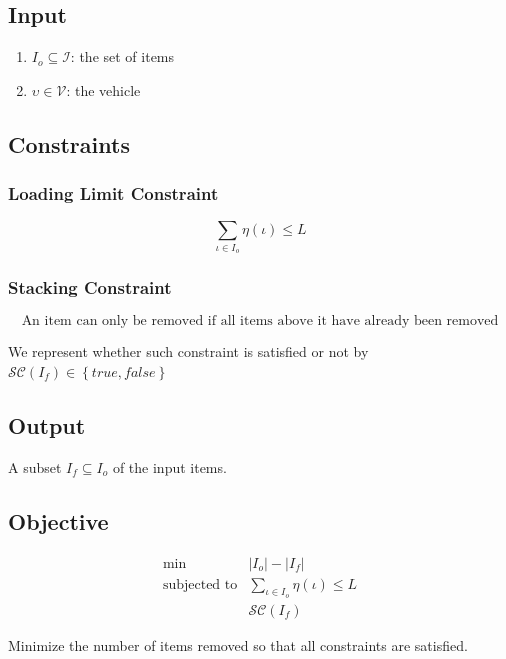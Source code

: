\documentclass{article}
\newcommand{\true}{\ensuremath{true}\xspace}
\newcommand{\false}{\ensuremath{false}\xspace}
\newcommand{\subjectedTo}{\ensuremath{\mbox{subjected to}}\xspace}
\newcommand{\abs}[1]{\ensuremath{\left| #1 \right|}\xspace}
\newcommand{\Set}[1]{\ensuremath{\left\{#1\right\}}}
\newcommand{\vehicleO}{\ensuremath{\upsilon}\xspace}
\newcommand{\vehicleSet}{\mathcal{V}\xspace}
\newcommand{\loadingFunction}{\ensuremath{\eta}\xspace}
\newcommand{\loadingFunctionApply}[1]{\loadingFunction \left( #1 \right)\xspace}
\newcommand{\loadingLimit}{\ensuremath{L}\xspace}
\newcommand{\itemO}{\ensuremath{\iota}\xspace}
\newcommand{\itemSet}{\ensuremath{\mathcal{I}}\xspace}
\newcommand{\itemInput}{\ensuremath{\mathit{I}_{o}}\xspace}
\newcommand{\itemOutput}{\ensuremath{\mathit{I}_{f}}\xspace}
\newcommand{\stackingPredicateSymbol}{\ensuremath{\mathcal{SC}}\xspace}
\newcommand{\stackingPredicate}[1]{\ensuremath{\stackingPredicateSymbol \left( #1 \right)}\xspace}
\newcommand{\vehicleInput}{\vehicleO}
\begin{document}
\subsection{Input}

\begin{enumerate}
	\item $\itemInput \subseteq \itemSet$: the set of items
	\item $\vehicleInput \in \vehicleSet$: the vehicle
\end{enumerate}

\subsection{Constraints}

\subsubsection*{Loading Limit Constraint}
\begin{equation}
	\label{constraint:loading-limit}
	\displaystyle\sum\limits_{\itemO \in \itemInput}
		\loadingFunctionApply{\itemO}
		\leq \loadingLimit
\end{equation}

\subsubsection*{Stacking Constraint}
\begin{equation}
	\label{constraint:stacking}
	\mbox{An item can only be removed if all items above it have already been removed}
\end{equation}

We represent whether such constraint is satisfied or not by $\stackingPredicate{\itemOutput} \in \Set{\true, \false}$

\subsection{Output}

A subset $\itemOutput \subseteq \itemInput$ of the input items.

\subsection{Objective}

\begin{eqnarray}
	\label{problem:items-removal}
	\min & \abs{\itemInput} - \abs{\itemOutput} \\
	\subjectedTo
		& \displaystyle\sum\limits_{\itemO \in \itemInput}
			\loadingFunctionApply{\itemO}
			\leq \loadingLimit \nonumber\\
		& \stackingPredicate{\itemOutput} \nonumber
\end{eqnarray}

Minimize the number of items removed so that all constraints are satisfied.



\end{document}
